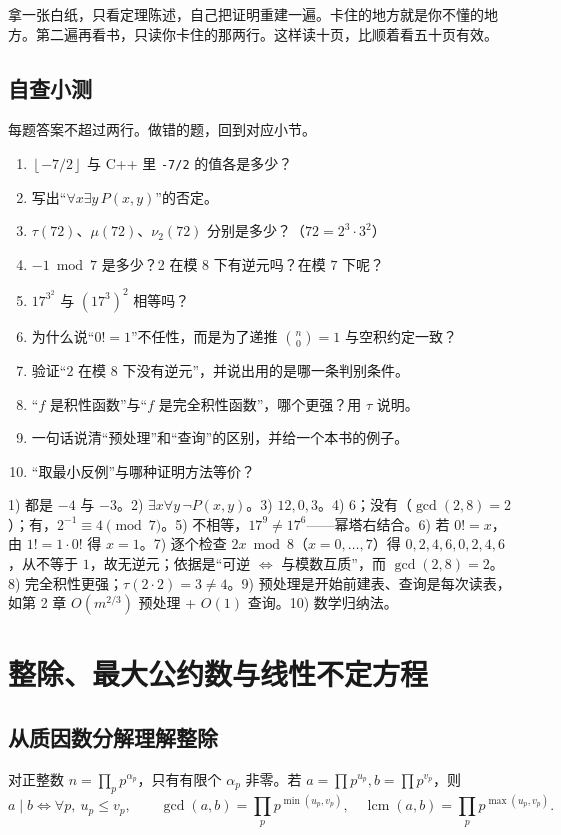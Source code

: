 \documentclass[UTF8,a4paper,11pt,oneside,openany,fontset=fandol]{ctexbook}
\theoremstyle{definition}
\newcommand{\lcm}{\operatorname{lcm}}
\newcommand{\floor}[1]{\left\lfloor #1\right\rfloor}
\begin{document}
\begin{tip}
拿一张白纸，只看定理陈述，自己把证明重建一遍。卡住的地方就是你不懂的地方。第二遍再看书，只读你卡住的那两行。这样读十页，比顺着看五十页有效。
\end{tip}

\section{自查小测}
每题答案不超过两行。做错的题，回到对应小节。

\begin{enumerate}
\item $\floor{-7/2}$ 与 C++ 里 \texttt{-7/2} 的值各是多少？
\item 写出“$\forall x\exists y\,P(x,y)$”的否定。
\item $\tau(72)$、$\mu(72)$、$\nu_2(72)$ 分别是多少？（$72=2^3\cdot3^2$）
\item $-1\bmod 7$ 是多少？$2$ 在模 $8$ 下有逆元吗？在模 $7$ 下呢？
\item $17^{3^{2}}$ 与 $(17^3)^2$ 相等吗？
\item 为什么说“$0!=1$”不任性，而是为了递推 $\binom{n}{0}=1$ 与空积约定一致？
\item 验证“$2$ 在模 $8$ 下没有逆元”，并说出用的是哪一条判别条件。
\item “$f$ 是积性函数”与“$f$ 是完全积性函数”，哪个更强？用 $\tau$ 说明。
\item 一句话说清“预处理”和“查询”的区别，并给一个本书的例子。
\item “取最小反例”与哪种证明方法等价？
\end{enumerate}

\begin{tip}[参考答案]
1) 都是 $-4$ 与 $-3$。2) $\exists x\forall y\,\lnot P(x,y)$。3) $12,0,3$。4) $6$；没有（$\gcd(2,8)=2$）；有，$2^{-1}\equiv4\pmod 7$。5) 不相等，$17^{9}\ne17^{6}$——幂塔右结合。6) 若 $0!=x$，由 $1!=1\cdot0!$ 得 $x=1$。7) 逐个检查 $2x\bmod 8$（$x=0,\ldots,7$）得 $0,2,4,6,0,2,4,6$，从不等于 $1$，故无逆元；依据是“可逆 $\iff$ 与模数互质”，而 $\gcd(2,8)=2$。8) 完全积性更强；$\tau(2\cdot2)=3\ne4$。9) 预处理是开始前建表、查询是每次读表，如第 2 章 $O(m^{2/3})$ 预处理 + $O(1)$ 查询。10) 数学归纳法。
\end{tip}


\chapter{整除、最大公约数与线性不定方程}
\section{从质因数分解理解整除}
对正整数 $n=\prod_p p^{\alpha_p}$，只有有限个 $\alpha_p$ 非零。若 $a=\prod p^{u_p},b=\prod p^{v_p}$，则
\[
 a\mid b\iff\forall p,\ u_p\le v_p,\qquad
 \gcd(a,b)=\prod_p p^{\min(u_p,v_p)},\quad
 \lcm(a,b)=\prod_p p^{\max(u_p,v_p)}.
\]
\end{document}
